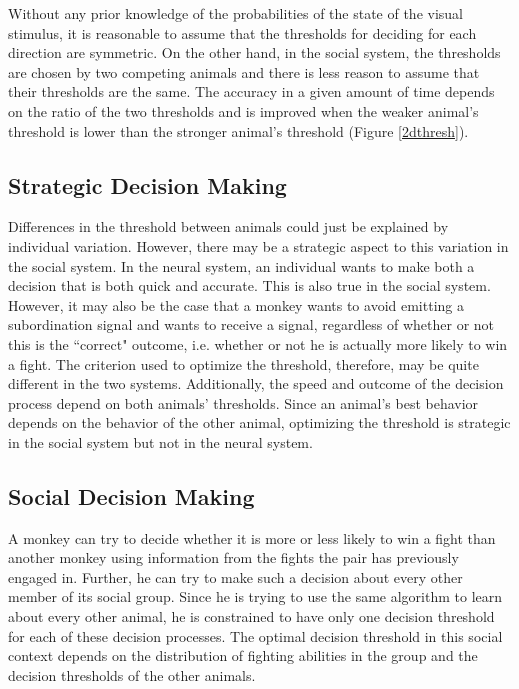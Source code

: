 \documentclass{article}
\begin{document}
Without any prior knowledge of the probabilities of the state of the visual stimulus, it is reasonable to assume that the thresholds for deciding for each direction are symmetric.  On the other hand, in the social system, the thresholds are chosen by two competing animals and there is less reason to assume that their thresholds are the same.  The accuracy in a given amount of time depends on the ratio of the two thresholds and is improved when the weaker animal's threshold is lower than the stronger animal's threshold (Figure \ref{2dthresh}).  

\subsection{Strategic Decision Making }
Differences in the threshold between animals could just be explained by individual variation.  However, there may be a strategic aspect to this variation in the social system.  In the neural system, an individual wants to make both a decision that is both quick and accurate.  This is also true in the social system.  However, it may also be the case that a monkey wants to avoid emitting a subordination signal and wants to receive a signal, regardless of whether or not this is the ``correct" outcome, i.e. whether or not he is actually more likely to win a fight.  The criterion used to optimize the threshold, therefore, may be quite different in the two systems.  Additionally, the speed and outcome of the decision process depend on both animals' thresholds.  Since an animal's best behavior depends on the behavior of the other animal, optimizing the threshold is strategic in the social system but not in the neural system.  

\subsection{Social Decision Making }
A monkey can try to decide whether it is more or less likely to win a fight than another monkey using information from the fights the pair has previously engaged in.  Further, he can try to make such a decision about every other member of its social group.  Since he is trying to use the same algorithm to learn about every other animal, he is constrained to have only one decision threshold for each of these decision processes.  The optimal decision threshold in this social context depends on the distribution of fighting abilities in the group and the decision thresholds of the other animals. 
\end{document}
